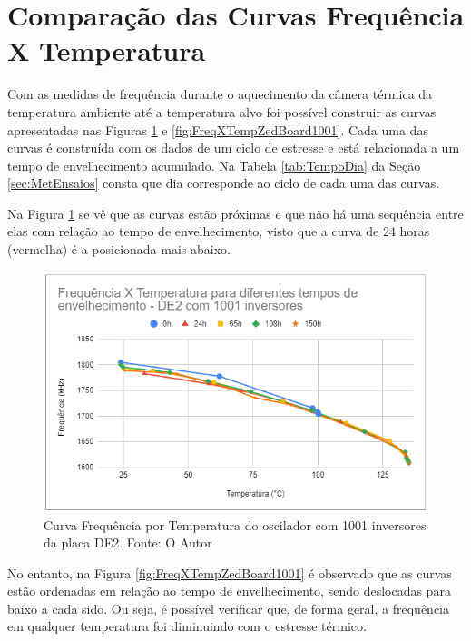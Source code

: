 \section{Comparação das Curvas Frequência X Temperatura}
\label{sec:ResFreqXTemp}

Com as medidas de frequência durante o aquecimento da câmera térmica da temperatura ambiente até a temperatura alvo foi possível construir as curvas apresentadas nas Figuras \ref{fig:FreqXTempDE21001} e \ref{fig:FreqXTempZedBoard1001}. Cada uma das curvas é construída com os dados de um ciclo de estresse e está relacionada a um tempo de envelhecimento acumulado. Na Tabela \ref{tab:TempoDia} da Seção \ref{sec:MetEnsaios} consta que dia corresponde ao ciclo de cada uma das curvas.

Na Figura \ref{fig:FreqXTempDE21001} 
se vê que as curvas estão próximas e que não há uma sequência entre elas com relação ao tempo de envelhecimento, visto que a curva de 24 horas (vermelha) é a posicionada mais abaixo.

\begin{figure}[H]
    \centering
    \includegraphics[scale=0.75]{figures/Resultados/FreqXTempDE21001}
    \caption{Curva Frequência por Temperatura do oscilador com 1001 inversores da placa DE2. Fonte: O Autor}
    \label{fig:FreqXTempDE21001}
\end{figure}

No entanto, na Figura \ref{fig:FreqXTempZedBoard1001} é observado que as curvas estão ordenadas em relação ao tempo de envelhecimento, sendo deslocadas para baixo a cada sido. Ou seja, é possível verificar que, de forma geral, a frequência em qualquer temperatura foi diminuindo com o estresse térmico.

